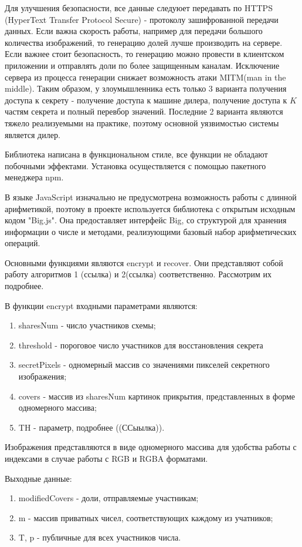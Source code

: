\documentclass[a4paper,article,14pt]{extarticle}
\begin{document}
Для улучшения безопасности, все данные следуюет передавать по HTTPS (HyperText Transfer Protocol Secure) - протоколу зашифрованной передачи данных.
Если важна скорость работы, например для передачи большого количества изображений, то генерацию долей лучше производить на сервере. 
Если важнее стоит безопасность, то генерацию можно провести в клиентском приложении и отправлять доли по более защищенным каналам.
Исключение сервера из процесса генерации снижает возможность атаки MITM(man in the middle). Таким образом, у злоумышленника есть
только 3 варианта получения доступа к секрету - получение доступа к машине дилера, получение доступа к $K$ частям секрета и полный перевбор значений.
Последние 2 варианта являются тяжело реализуемыми на практике, поэтому основной уязвимостью системы является дилер.

Библиотека написана в функциональном стиле, все функции не обладают побочными эффектами.
Установка осуществляется с помощью пакетного менеджера npm.

В языке JavaScript изначально не предусмотрена возможность работы с длинной арифметикой, поэтому в проекте используется библиотека
с открытым исходным кодом "Big.js". Она предоставляет интерфейс Big, со структурой для хранения информации о числе и методами, 
реализующими базовый набор арифметических операций.

Основными функциями являются encrypt и recover. Они представляют собой работу алгоритмов 1 (ссылка) и 2(ссылка) соответственно. Рассмотрим
их подробнее.

В функции encrypt входными параметрами являются:
\begin{enumerate}[leftmargin=2cm]
    \item sharesNum - число участников схемы;
    \item threshold - пороговое число участников для восстановления секрета
    \item secretPixels - одномерный массив со значениями пикселей секретного изображения;
    \item covers - массив из sharesNum картинок прикрытия, представленных в форме одномерного массива;
    \item TH - параметр, подробнее ((ССыылка)).
\end{enumerate}
Изображения представляются в виде одномерного массива для удобства работы с индексами в случае работы с RGB и RGBA форматами.

Выходные данные:

\begin{enumerate}[leftmargin=2cm]
    \item modifiedCovers - доли, отправляемые участникам;
    \item m - массив приватных чисел, соответствующих каждому из учатников;
    \item T, p - публичные для всех участников числа.
\end{enumerate}
\end{document}
